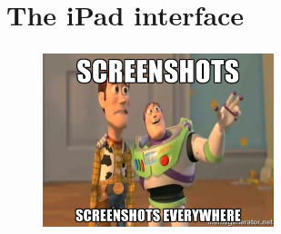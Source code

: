 \documentclass{beamer}
\begin{document}
	\section{The iPad interface}

	\begin{frame}
		\frametitle{\insertsection}
		\begin{figure}
			\centering
			  \includegraphics[width=0.6\textwidth]{images/marine.jpg}
		\end{figure}
	\end{frame}

	\begin{frame}
		\frametitle{\insertsection}
	\end{frame}

	\begin{frame}
		\frametitle{\insertsection}
	\end{frame}
\end{document}

